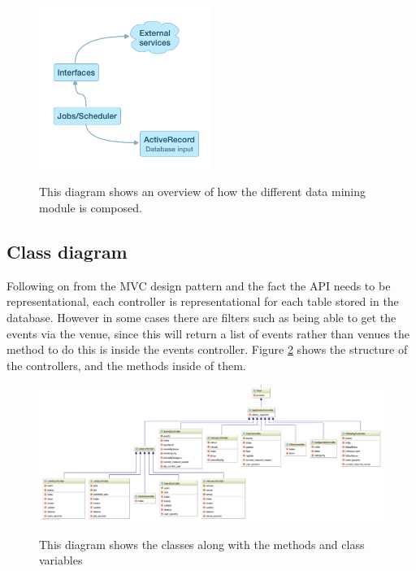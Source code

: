 			\begin{figure}[ht] %
				\caption[Overview of the data mining aspect]{This diagram shows an overview of how the different data mining module is composed.}
				\centering
				\includegraphics[width=0.5\textwidth]{Images/mining-overview}
				\label{fig:mining}
			\end{figure}

		\subsection{Class diagram}
			Following on from the MVC design pattern and the fact the API needs to be representational, each controller is representational for each table stored in the database. However in some cases there are filters such as being able to get the events via the venue, since this will return a list of events rather than venues the method to do this is inside the events controller. Figure \ref{fig:controllers} shows the structure of the controllers, and the methods inside of them. 

			\begin{figure}[ht] %
				\caption[Controllers Class Diagram]{This diagram shows the classes along with the methods and class variables}
				\centering
				\includegraphics[width=1\textwidth,angle=90]{Images/controllers_crop}
				\label{fig:controllers}
			\end{figure}


